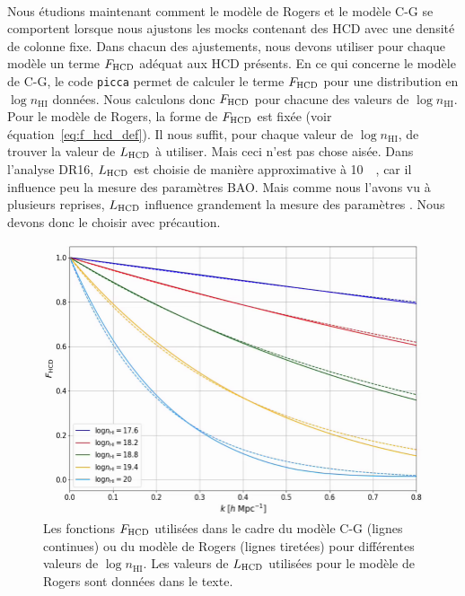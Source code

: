 \paragraph{}
Nous étudions maintenant comment le modèle de Rogers et le modèle C-G se comportent lorsque nous ajustons les mocks contenant des HCD avec une densité de colonne fixe.
Dans chacun des ajustements, nous devons utiliser pour chaque modèle un terme $F_{\textsc{HCD}}$ adéquat aux HCD présents.
En ce qui concerne le modèle de C-G, le code \texttt{picca} permet de calculer le terme $F_{\textsc{HCD}}$ pour une distribution en $\log n_{\mathrm{HI}}$ données. Nous calculons donc $F_{\textsc{HCD}}$ pour chacune des valeurs de $\log n_{\mathrm{HI}}$.
Pour le modèle de Rogers, la forme de $F_{\textsc{HCD}}$ est fixée (voir équation~\ref{eq:f_hcd_def}). Il nous suffit, pour chaque valeur de $\log n_{\mathrm{HI}}$, de trouver la valeur de $L_{\textsc{HCD}}$ à utiliser. Mais ceci n'est pas chose aisée. Dans l'analyse DR16, $L_{\textsc{HCD}}$ est choisie de manière approximative à \SI{10}{\perh\Mpc}, car il influence peu la mesure des paramètres BAO.
Mais comme nous l'avons vu à plusieurs reprises, $L_{\textsc{HCD}}$ influence grandement la mesure des paramètres \lya{}. Nous devons donc le choisir avec précaution.

\begin{figure}
  \centering
  \includegraphics[scale=0.4]{f_hcd_fixed}
  \caption{Les fonctions $F_{\textsc{HCD}}$ utilisées dans le cadre du modèle C-G (lignes continues) ou du modèle de Rogers (lignes tiretées) pour différentes valeurs de $\log n_{\mathrm{HI}}$. Les valeurs de  $L_{\textsc{HCD}}$ utilisées pour le modèle de Rogers sont données dans le texte.
}
  \label{fig:f_hcd_fixed}
\end{figure}

